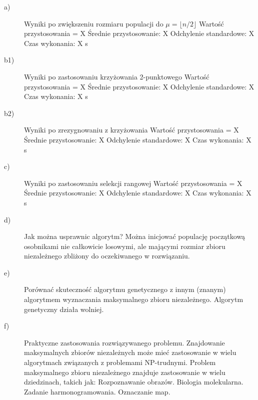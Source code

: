 \documentclass[11pt]{article}
\begin{document}
\begin{description}

\item[a)] Wyniki po zwiększeniu rozmiaru populacji do $ \mu = \lfloor n/2 \rfloor $\newline
Wartość przystosowania = X\newline
Średnie przystosowanie: X\newline
Odchylenie standardowe: X\newline
Czas wykonania: X s
\item[b1)] Wyniki po zastosowaniu krzyżowania 2-punktowego\newline
Wartość przystosowania = X\newline
Średnie przystosowanie: X\newline
Odchylenie standardowe: X\newline
Czas wykonania: X s
\item[b2)] Wyniki po zrezygnowaniu z krzyżowania\newline
Wartość przystosowania = X\newline
Średnie przystosowanie: X\newline
Odchylenie standardowe: X\newline
Czas wykonania: X s
\item[c)] Wyniki po zastosowaniu selekcji rangowej\newline
Wartość przystosowania = X\newline
Średnie przystosowanie: X\newline
Odchylenie standardowe: X\newline
Czas wykonania: X s
\item[d)] Jak można usprawnic algorytm?\newline
Można inicjować populację początkową osobnikami nie całkowicie losowymi, ale
mającymi rozmiar zbioru niezależnego zbliżony do oczekiwanego w rozwiązaniu.
\item[e)] Porównać skuteczność algorytmu genetycznego z innym (znanym)
algorytmem wyznaczania maksymalnego zbioru niezależnego.\newline
Algorytm genetyczny działa wolniej.
\item[f)] Praktyczne zastosowania rozwiązywanego problemu.\newline
Znajdowanie maksymalnych zbiorów niezależnych może mieć zastosowanie w wielu
algorytmach związanych z problemami NP-trudnymi.\newline
Problem maksymalnego zbioru niezależnego znajduje zastosowanie w wielu dziedzinach, takich jak:\newline
Rozpoznawanie obrazów.\newline
Biologia molekularna.\newline
Zadanie harmonogramowania.\newline
Oznaczanie map.
\end{description}
\end{document}
